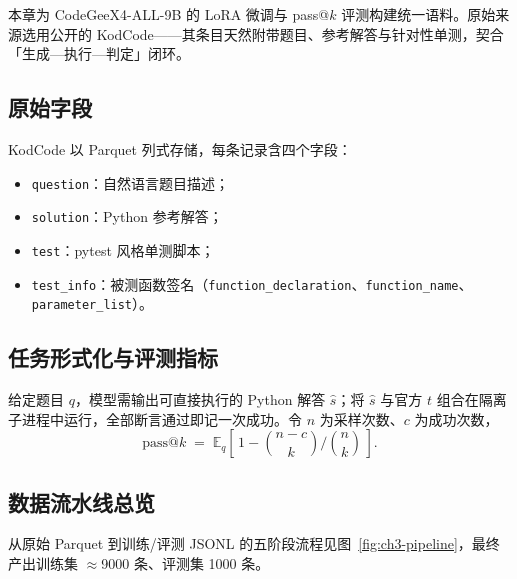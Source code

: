 
本章为 CodeGeeX4-ALL-9B\cite{thudm2024codegeex4all9b} 的 LoRA 微调与 pass@$k$\cite{chen2021evaluating} 评测构建统一语料。原始来源选用公开的 KodCode\cite{xu2025kodcode}——其条目天然附带题目、参考解答与针对性单测，契合「生成—执行—判定」闭环。

\subsection{原始字段}
KodCode 以 Parquet 列式存储，每条记录含四个字段：
\begin{itemize}
    \item \texttt{question}：自然语言题目描述；
    \item \texttt{solution}：Python 参考解答；
    \item \texttt{test}：pytest 风格单测脚本；
    \item \texttt{test\_info}：被测函数签名（\texttt{function\_declaration}、\texttt{function\_name}、\texttt{parameter\_list}）。
\end{itemize}

\subsection{任务形式化与评测指标}
给定题目 $q$，模型需输出可直接执行的 Python 解答 $\hat{s}$；将 $\hat{s}$ 与官方 $t$ 组合在隔离子进程中运行，全部断言通过即记一次成功。令 $n$ 为采样次数、$c$ 为成功次数，
\[
\text{pass@}k \;=\; \mathbb{E}_{q}\!\left[\,1 - \binom{n-c}{k}\Big/\binom{n}{k}\,\right].
\]

\subsection{数据流水线总览}
从原始 Parquet 到训练/评测 JSONL 的五阶段流程见图~\ref{fig:ch3-pipeline}，最终产出训练集 $\approx$9000 条、评测集 1000 条。

